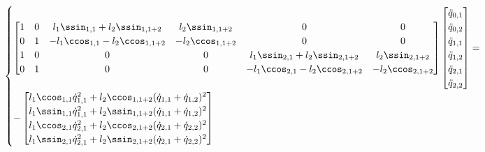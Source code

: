 \begin{itemize}
\begin{equation}
\begin{cases}
	\begin{bmatrix}
	1 & 0 & l_1 \ssin_{1,1} + l_2 \ssin_{1,1+2} & l_2 \ssin_{1,1+2} & 0 & 0 \\
	0 & 1 & -l_1\ccos_{1,1} - l_2 \ccos_{1,1+2} & - l_2 \ccos_{1,1+2} & 0 & 0 \\
	1 & 0 & 0 & 0 & l_1 \ssin_{2,1} + l_2 \ssin_{2,1+2} & l_2 \ssin_{2,1+2}  \\
	0 & 1 & 0 & 0 & -l_1 \ccos_{2,1} - l_2 \ccos_{2,1+2} & - l_2 \ccos_{2,1+2} \\
	\end{bmatrix}
	\begin{bmatrix}
	\ddot{q}_{0,1} \\
	\ddot{q}_{0,2} \\
	\ddot{q}_{1,1} \\
	\ddot{q}_{1,2} \\
	\ddot{q}_{2,1} \\
	\ddot{q}_{2,2} \\
	\end{bmatrix}
	= \\
	- \begin{bmatrix}
	l_1 \ccos_{1,1} \dot{q}_{1,1}^2 + l_2 \ccos_{1,1+2} (\dot{q}_{1,1}+\dot{q}_{1,2})^2 \\
	l_1 \ssin_{1,1} \dot{q}_{1,1}^2 + l_2 \ssin_{1,1+2} (\dot{q}_{1,1}+\dot{q}_{1,2})^2 \\
	l_1 \ccos_{2,1} \dot{q}_{2,1}^2 + l_2 \ccos_{2,1+2} (\dot{q}_{2,1}+\dot{q}_{2,2})^2 \\
	l_1 \ssin_{2,1} \dot{q}_{2,1}^2 + l_2 \ssin_{2,1+2} (\dot{q}_{2,1}+\dot{q}_{2,2})^2 \\
	\end{bmatrix}
	\end{cases}
\end{equation}

\end{itemize}